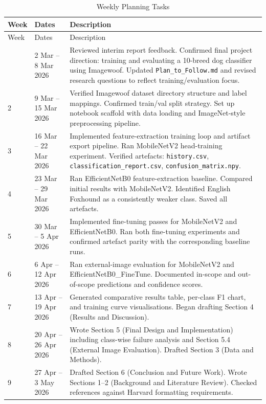 \documentclass[12pt, a4paper]{article}
\begin{document}
\begin{longtable}{@{}lp{3.5cm}p{9.5cm}@{}}
  \caption{Weekly Planning Tasks} \\
  \toprule
  Week & Dates & Description \\
  \midrule
  \endfirsthead
  \toprule
  Week & Dates & Description \\
  \midrule
  \endhead
  \bottomrule
  \endlastfoot
  1  & 2 Mar -- 8 Mar 2026   & Reviewed interim report feedback. Confirmed final project direction: training and evaluating a 10-breed dog classifier using Imagewoof. Updated \texttt{Plan\_to\_Follow.md} and revised research questions to reflect training/evaluation focus. \\[4pt]
  2  & 9 Mar -- 15 Mar 2026  & Verified Imagewoof dataset directory structure and label mappings. Confirmed train/val split strategy. Set up notebook scaffold with data loading and ImageNet-style preprocessing pipeline. \\[4pt]
  3  & 16 Mar -- 22 Mar 2026 & Implemented feature-extraction training loop and artifact export pipeline. Ran MobileNetV2 head-training experiment. Verified artefacts: \texttt{history.csv}, \texttt{classification\_report.csv}, \texttt{confusion\_matrix.npy}. \\[4pt]
  4  & 23 Mar -- 29 Mar 2026 & Ran EfficientNetB0 feature-extraction baseline. Compared initial results with MobileNetV2. Identified English Foxhound as a consistently weaker class. Saved all artefacts. \\[4pt]
  5  & 30 Mar -- 5 Apr 2026  & Implemented fine-tuning passes for MobileNetV2 and EfficientNetB0. Ran both fine-tuning experiments and confirmed artefact parity with the corresponding baseline runs. \\[4pt]
  6  & 6 Apr -- 12 Apr 2026  & Ran external-image evaluation for MobileNetV2 and EfficientNetB0\_FineTune. Documented in-scope and out-of-scope predictions and confidence scores. \\[4pt]
  7  & 13 Apr -- 19 Apr 2026 & Generated comparative results table, per-class F1 chart, and training curve visualisations. Began drafting Section 4 (Results and Discussion). \\[4pt]
  8  & 20 Apr -- 26 Apr 2026 & Wrote Section 5 (Final Design and Implementation) including class-wise failure analysis and Section 5.4 (External Image Evaluation). Drafted Section 3 (Data and Methods). \\[4pt]
  9  & 27 Apr -- 3 May 2026  & Drafted Section 6 (Conclusion and Future Work). Wrote Sections 1--2 (Background and Literature Review). Checked references against Harvard formatting requirements. \\[4pt]

\end{longtable}
\end{document}
